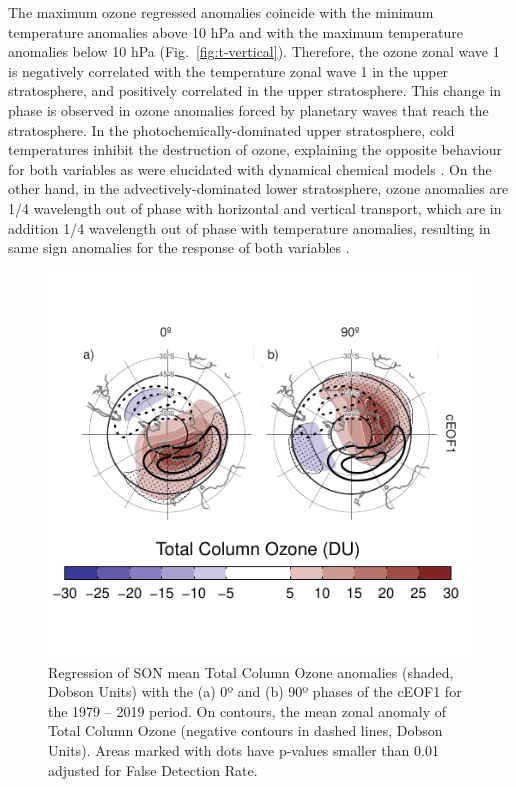 \documentclass[pdflatex,sn-basic]{sn-jnl}
\theoremstyle{thmstyleone}%
\theoremstyle{thmstyletwo}%
\theoremstyle{thmstylethree}%
\begin{document}
The maximum ozone regressed anomalies coincide with the minimum temperature anomalies above 10 hPa and with the maximum temperature anomalies below 10 hPa (Fig.~\ref{fig:t-vertical}).
Therefore, the ozone zonal wave 1 is negatively correlated with the temperature zonal wave 1 in the upper stratosphere, and positively correlated in the upper stratosphere.
This change in phase is observed in ozone anomalies forced by planetary waves that reach the stratosphere.
In the photochemically-dominated upper stratosphere, cold temperatures inhibit the destruction of ozone, explaining the opposite behaviour for both variables as were elucidated with dynamical chemical models \citep{hartmann1979, wirth1993, smith1995}.
On the other hand, in the advectively-dominated lower stratosphere, ozone anomalies are 1/4 wavelength out of phase with horizontal and vertical transport, which are in addition 1/4 wavelength out of phase with temperature anomalies, resulting in same sign anomalies for the response of both variables \citep{hartmann1979, wirth1993, smith1995}.



\begin{figure}
\centering
\includegraphics{../figures/o3-regr-1.pdf}
\caption{\label{fig:o3-regr}Regression of SON mean Total Column Ozone anomalies (shaded, Dobson Units) with the (a) 0º and (b) 90º phases of the cEOF1 for the 1979 -- 2019 period. On contours, the mean zonal anomaly of Total Column Ozone (negative contours in dashed lines, Dobson Units). Areas marked with dots have p-values smaller than 0.01 adjusted for False Detection Rate.}
\end{figure}
\end{document}
